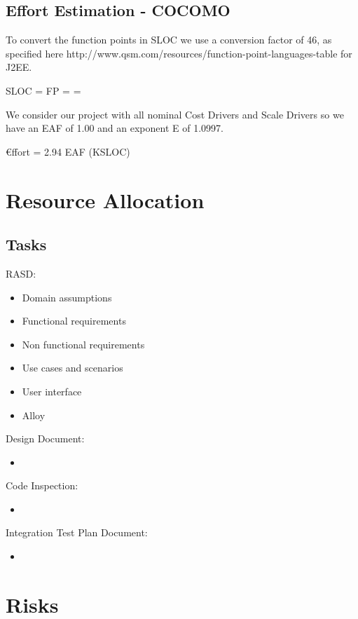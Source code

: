 \documentclass{article}
\begin{document}
\subsection{Effort Estimation - COCOMO}
To convert the function points in SLOC we use a 
conversion factor of 46, as specified here 
http://www.qsm.com/resources/function-point-languages-table
for J2EE.
\begin{center}
	SLOC = FP  =  = %
\end{center}
We consider our project with all nominal Cost Drivers and
Scale Drivers so we have an EAF of 1.00 and an
exponent E of 1.0997.
\begin{center}
	€ffort = 2.94 \texttimes EAF \texttimes (KSLOC)
\end{center}
\section{Resource Allocation}
\subsection{Tasks}
RASD:
\begin{itemize}
\item Domain assumptions
\item Functional requirements
\item Non functional requirements
\item Use cases and scenarios
\item User interface
\item Alloy
\end{itemize}
Design Document:
\begin{itemize}
\item
\end{itemize}
Code Inspection:
\begin{itemize}
\item
\end{itemize}
Integration Test Plan Document:
\begin{itemize}
\item 
\end{itemize}
\section{Risks}
\end{document}

